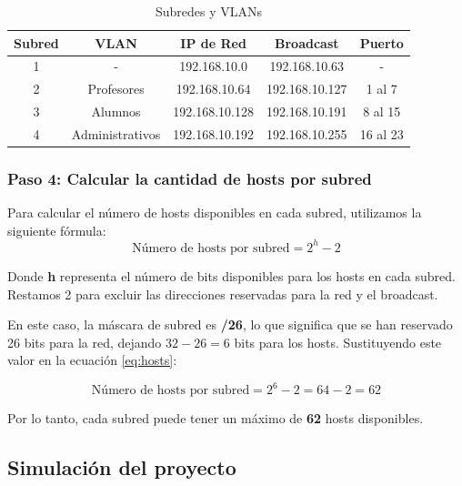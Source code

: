     \begin{table}[H]
        \begin{center}
            \begin{tabular}{ c | c | c | c | c }
                \textbf{Subred} & \textbf{VLAN} & \textbf{IP de Red} & \textbf{Broadcast} & \textbf{Puerto}\\ \hline
                1 & - & 192.168.10.0 & 192.168.10.63 & - \\
                2 & Profesores & 192.168.10.64 & 192.168.10.127 & 1 al 7\\
                3 & Alumnos & 192.168.10.128 & 192.168.10.191 & 8 al 15\\
                4 & Administrativos & 192.168.10.192 & 192.168.10.255 & 16 al 23\\
            \end{tabular}
            \caption{Subredes y VLANs}
            \label{tab:VLANs}
        \end{center}
    \end{table}

    \subsubsection*{Paso 4: Calcular la cantidad de hosts por subred}
    Para calcular el número de hosts disponibles en cada subred, utilizamos la siguiente fórmula:
    \begin{equation}
        \text{Número de hosts por subred} = 2^h - 2
        \label{eq:hosts}
    \end{equation}

    Donde \textbf{h} representa el número de bits disponibles para los hosts en cada subred. Restamos 2 para excluir las direcciones reservadas para la red y el broadcast.
    
    En este caso, la máscara de subred es \textbf{/26}, lo que significa que se han reservado 26 bits para la red, dejando \( 32 - 26 = 6 \) bits para los hosts. Sustituyendo este valor en la ecuación \ref{eq:hosts}:
    
    \begin{equation}
        \text{Número de hosts por subred} = 2^6 - 2 = 64 - 2 = 62
    \end{equation}
    
    Por lo tanto, cada subred puede tener un máximo de \textbf{62} hosts disponibles.

    \subsection{Simulación del proyecto}
